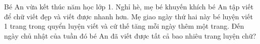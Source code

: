 \begin{ex}%
	Bé An vừa kết thúc năm học lớp 1. Nghỉ hè, mẹ bé khuyến khích bé An tập viết để chữ viết đẹp và viết được nhanh hơn. Mẹ giao ngày thứ hai này bé luyện viết 1 trang trong quyển luyện viết và cứ thế tăng mỗi ngày thêm một trang. Đến ngày chủ nhật của tuần đó bé An đã viết được tất cả bao nhiêu trang luyện chữ?
	\par{}
\end{ex} 

